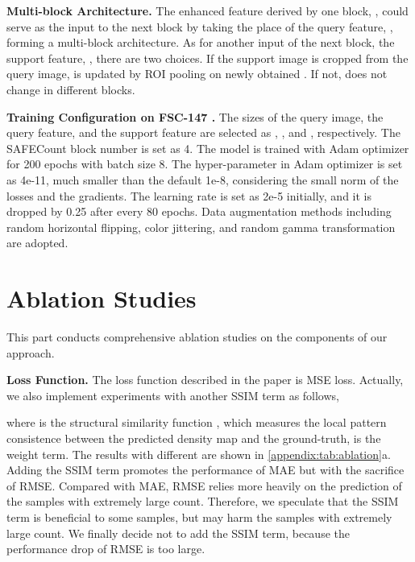 \documentclass[10pt,twocolumn,letterpaper]{article}
\newcommand{\method}{SAFECount\xspace}
\begin{document}
\vspace{2pt}\noindent\textbf{Multi-block Architecture.} The enhanced feature derived by one block, , could serve as the input to the next block by taking the place of the query feature, , forming a multi-block architecture. As for another input of the next block, the support feature, , there are two choices. If the support image is cropped from the query image,  is updated by ROI pooling on newly obtained . If not,  does not change in different blocks. 


\vspace{2pt}\noindent\textbf{Training Configuration on FSC-147 \cite{famnet}.} 
The sizes of the query image, the query feature, and the support feature are selected as , , and , respectively. 
The \method block number is set as 4. 
The model is trained with Adam optimizer \cite{adam} for 200 epochs with batch size 8. 
The hyper-parameter  in Adam optimizer is set as 4e-11, much smaller than the default 1e-8, considering the small norm of the losses and the gradients. 
The learning rate is set as 2e-5 initially, and it is dropped by 0.25 after every 80 epochs. 
Data augmentation methods including random horizontal flipping, color jittering, and random gamma transformation are adopted. 

 
\section{Ablation Studies}\label{appendix:sec:ablation}


This part conducts comprehensive ablation studies on the components of our approach.


\vspace{2pt}\noindent\textbf{Loss Function.}
The loss function described in the paper is MSE loss. Actually, we also implement experiments with another SSIM term as follows,

where  is the structural similarity function \cite{ssim}, which measures the local pattern consistence between the predicted density map and the ground-truth,  is the weight term. 
The results with different  are shown in \cref{appendix:tab:ablation}a. 
Adding the SSIM term promotes the performance of MAE but with the sacrifice of RMSE. 
Compared with MAE, RMSE relies more heavily on the prediction of the samples with extremely large count. 
Therefore, we speculate that the SSIM term is beneficial to some samples, but may harm the samples with extremely large count. 
We finally decide not to add the SSIM term, because the performance drop of RMSE is too large. 
\end{document}
